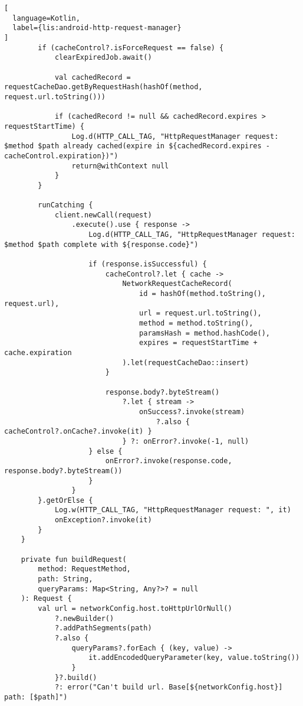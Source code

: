 \begin{lstlisting}[
  language=Kotlin,
  label={lis:android-http-request-manager}
]
        if (cacheControl?.isForceRequest == false) {
            clearExpiredJob.await()

            val cachedRecord = requestCacheDao.getByRequestHash(hashOf(method, request.url.toString()))

            if (cachedRecord != null && cachedRecord.expires > requestStartTime) {
                Log.d(HTTP_CALL_TAG, "HttpRequestManager request: $method $path already cached(expire in ${cachedRecord.expires - cacheControl.expiration})")
                return@withContext null
            }
        }

        runCatching {
            client.newCall(request)
                .execute().use { response ->
                    Log.d(HTTP_CALL_TAG, "HttpRequestManager request: $method $path complete with ${response.code}")

                    if (response.isSuccessful) {
                        cacheControl?.let { cache ->
                            NetworkRequestCacheRecord(
                                id = hashOf(method.toString(), request.url),
                                url = request.url.toString(),
                                method = method.toString(),
                                paramsHash = method.hashCode(),
                                expires = requestStartTime + cache.expiration
                            ).let(requestCacheDao::insert)
                        }

                        response.body?.byteStream()
                            ?.let { stream ->
                                onSuccess?.invoke(stream)
                                    ?.also { cacheControl?.onCache?.invoke(it) }
                            } ?: onError?.invoke(-1, null)
                    } else {
                        onError?.invoke(response.code, response.body?.byteStream())
                    }
                }
        }.getOrElse {
            Log.w(HTTP_CALL_TAG, "HttpRequestManager request: ", it)
            onException?.invoke(it)
        }
    }

    private fun buildRequest(
        method: RequestMethod,
        path: String,
        queryParams: Map<String, Any?>? = null
    ): Request {
        val url = networkConfig.host.toHttpUrlOrNull()
            ?.newBuilder()
            ?.addPathSegments(path)
            ?.also {
                queryParams?.forEach { (key, value) ->
                    it.addEncodedQueryParameter(key, value.toString())
                }
            }?.build()
            ?: error("Can't build url. Base[${networkConfig.host}] path: [$path]")


\end{lstlisting}
